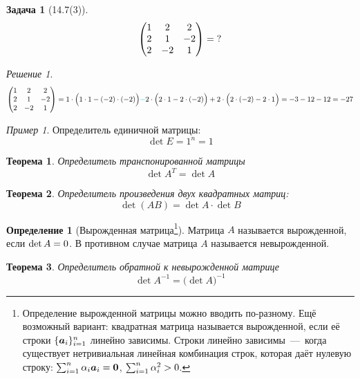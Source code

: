 \documentclass[a4paper,12pt]{article}
\newtheorem{theorem}{Теорема}[section]
\newtheorem*{problem}{Задача}
\theoremstyle{definition}
\newtheorem{definition}{Определение}[section]
\theoremstyle{remark}
\newtheorem*{example}{Пример}
\theoremstyle{remark}
\theoremstyle{remark}
\newtheorem*{solution}{Решение}
\begin{document}
  \begin{problem}[14.7(3)]
    \[
      \begin{pmatrix}
        1 & 2 & 2\\
        2 & 1 & -2\\
        2 & -2 & 1
      \end{pmatrix} = \operatorname{?}
    \]
  \end{problem}
  
  \begin{solution}
    \[
      \begin{pmatrix}
        1 & 2 & 2\\
        2 & 1 & -2\\
        2 & -2 & 1
      \end{pmatrix}
      = 1 \cdot \Bigl(1 \cdot 1 - (-2) \cdot (-2)\Bigr)
        \textcolor{light-cyan}{-} 2 \cdot \Bigl(2 \cdot 1 - 2 \cdot (-2)\Bigr)
        + 2 \cdot \Bigl(2 \cdot (-2) - 2 \cdot 1\Bigr)
      = -3 - 12 - 12
      = -27
    \]
  \end{solution}
  
  \begin{example}
    Определитель единичной матрицы:
    \[
      \det E = 1^n = 1
    \]
  \end{example}

  \begin{theorem}
    Определитель транспонированной матрицы
    \[
      \det A^T = \det A
    \]
  \end{theorem}
  
  \begin{theorem}
    Определитель произведения двух квадратных матриц:
    \[
      \det (AB) = \det A \cdot \det B
    \]
  \end{theorem}
  
  \begin{definition}[Вырожденная матрица\footnote{Определение вырожденной матрицы можно вводить по-разному. Ещё возможный вариант: квадратная матрица называется вырожденной, если её строки $\{\boldsymbol a_i\}_{i=1}^n$ линейно зависимы. Строки линейно зависимы~---~когда существует нетривиальная линейная комбинация строк, которая даёт нулевую строку: $\sum_{i=1}^n \alpha_i \bds a_i \hm= \bds 0$, $\sum_{i=1}^n \alpha_i^2 \hm > 0$.}]
    Матрица $A$ называется вырожденной, если $\det A \hm= 0$.
    В противном случае матрица $A$ называется невырожденной.
  \end{definition}
  
  \begin{theorem}
    Определитель обратной к \emph{невырожденной} матрице
    \[
      \det A^{-1} = \bigl(\det A\bigl)^{-1}
    \]
  \end{theorem}
  
\end{document}
